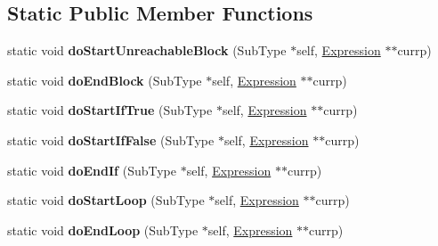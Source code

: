 \subsection*{Static Public Member Functions}
\begin{DoxyCompactItemize}
\item 
\mbox{\label{structwasm_1_1_c_f_g_walker_a3d2003c198e75964e8fbb3f585d70bf1}} 
static void {\bfseries do\+Start\+Unreachable\+Block} (Sub\+Type $\ast$self, \mbox{\hyperlink{classwasm_1_1_expression}{Expression}} $\ast$$\ast$currp)
\item 
\mbox{\label{structwasm_1_1_c_f_g_walker_ab2394c8d592cf03600e21590bd4507f0}} 
static void {\bfseries do\+End\+Block} (Sub\+Type $\ast$self, \mbox{\hyperlink{classwasm_1_1_expression}{Expression}} $\ast$$\ast$currp)
\item 
\mbox{\label{structwasm_1_1_c_f_g_walker_a1d3a00fe862cb0d2081f59fb4c55ad21}} 
static void {\bfseries do\+Start\+If\+True} (Sub\+Type $\ast$self, \mbox{\hyperlink{classwasm_1_1_expression}{Expression}} $\ast$$\ast$currp)
\item 
\mbox{\label{structwasm_1_1_c_f_g_walker_afceb8f90cf826f2dc3ffbfa0d9cb8d17}} 
static void {\bfseries do\+Start\+If\+False} (Sub\+Type $\ast$self, \mbox{\hyperlink{classwasm_1_1_expression}{Expression}} $\ast$$\ast$currp)
\item 
\mbox{\label{structwasm_1_1_c_f_g_walker_ac094d3378fecf7af046c0c150ed289ca}} 
static void {\bfseries do\+End\+If} (Sub\+Type $\ast$self, \mbox{\hyperlink{classwasm_1_1_expression}{Expression}} $\ast$$\ast$currp)
\item 
\mbox{\label{structwasm_1_1_c_f_g_walker_ab4e973e3d6ce62cab99ada32aff57d6d}} 
static void {\bfseries do\+Start\+Loop} (Sub\+Type $\ast$self, \mbox{\hyperlink{classwasm_1_1_expression}{Expression}} $\ast$$\ast$currp)
\item 
\mbox{\label{structwasm_1_1_c_f_g_walker_a7f0b67cb44759626069b58aab061e9eb}} 
static void {\bfseries do\+End\+Loop} (Sub\+Type $\ast$self, \mbox{\hyperlink{classwasm_1_1_expression}{Expression}} $\ast$$\ast$currp)
$$
\end{DoxyCompactItemize}
